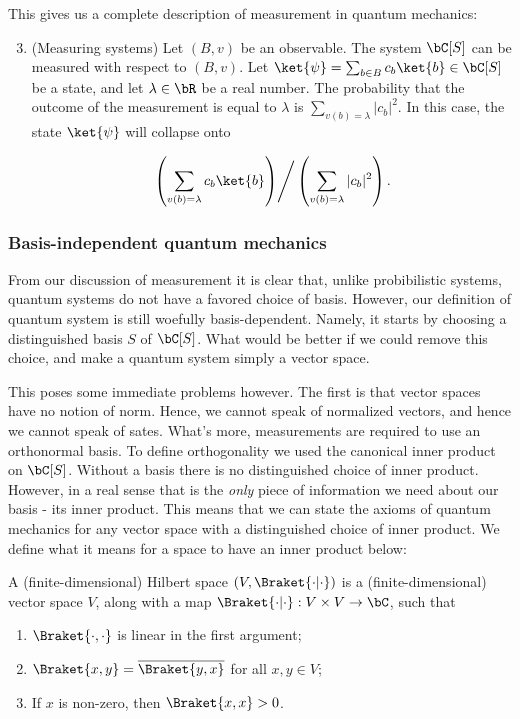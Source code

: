 This gives us a complete description of measurement in quantum mechanics:

\begin{enumerate}[1''.]
\setcounter{enumi}{2}

\item (Measuring systems) Let $(B,v)$ be an observable. The system $\bC[S]$ can be measured with respect to $(B,v)$. Let $\ket{\psi}=\sum_{b\in B}c_b \ket{b}\in \bC[S]$ be a state, and let $\lambda\in \bR$ be a real number. The probability that the outcome of the measurement is equal to $\lambda$ is $\sum_{v(b)=\lambda}|c_b|^2$. In this case, the state $\ket{\psi}$ will collapse onto

$$\left.\left(\sum_{v(b)=\lambda}c_b \ket{b}\right)\right/ \left(\sum_{v(b)=\lambda}|c_b|^2\right).$$
\end{enumerate}



\subsubsection{Basis-independent quantum mechanics}

From our discussion of measurement it is clear that, unlike probibilistic systems, quantum systems do not have a favored choice of basis. However, our definition of quantum system is still woefully basis-dependent. Namely, it starts by choosing a distinguished basis $S$ of $\bC[S]$. What would be better if we could remove this choice, and make a quantum system simply a vector space.

This poses some immediate problems however. The first is that vector spaces have no notion of norm. Hence, we cannot speak of normalized vectors, and hence we cannot speak of sates. What's more, measurements are required to use an orthonormal basis. To define orthogonality we used the canonical inner product on $\bC[S]$. Without a basis there is no distinguished choice of inner product. However, in a real sense that is the {\em only} piece of information we need about our basis - its inner product. This means that we can state the axioms of quantum mechanics for any vector space with a distinguished choice of inner product. We define what it means for a space to have an inner product below:

\begin{defn} A (finite-dimensional) Hilbert space $(V,\Braket{\cdot | \cdot})$ is a (finite-dimensional) vector space $V$, along with a map $\Braket{\cdot | \cdot}:V\times V\to \bC$, such that

\begin{enumerate}
\item $\Braket{\cdot,\cdot}$ is linear in the first argument;
\item $\Braket{x,y}=\overline{\Braket{y,x}}$ for all $x,y\in V$;
\item If $x$ is non-zero, then $\Braket{x,x}>0$.
\end{enumerate}
\end{defn}

